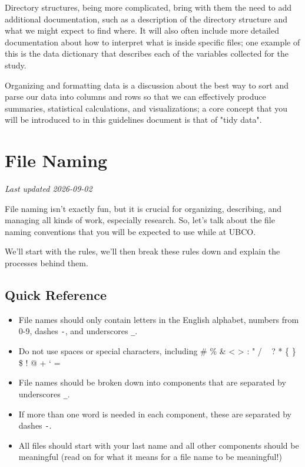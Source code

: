 \documentclass[
]{book}
\providecommand{\tightlist}{%
  \setlength{\itemsep}{0pt}\setlength{\parskip}{0pt}}
\begin{document}
Directory structures, being more complicated, bring with them the need to add additional documentation, such as a description of the directory structure and what we might expect to find where. It will also often include more detailed documentation about how to interpret what is inside specific files; one example of this is the data dictionary that describes each of the variables collected for the study.

Organizing and formatting data is a discussion about the best way to sort and parse our data into columns and rows so that we can effectively produce summaries, statistical calculations, and visualizations; a core concept that you will be introduced to in this guidelines document is that of "tidy data".

\chapter{File Naming}\label{file-naming}

\emph{Last updated 2026-09-02}

File naming isn't exactly fun, but it is crucial for organizing, describing, and managing all kinds of work, especially research. So, let's talk about the file naming conventions that you will be expected to use while at UBCO.

We'll start with the rules, we'll then break these rules down and explain the processes behind them.

\section{Quick Reference}\label{quick-reference}

\begin{itemize}
\tightlist
\item
  File names should only contain letters in the English alphabet, numbers from 0-9, dashes \texttt{-}, and underscores \texttt{\_}.
\item
  Do not use spaces or special characters, including \# \% \& \textless{} \textgreater{} : " / ~\textbar{} ? * \{ \} \$ ! \textquotesingle{} @ + ` =
\item
  File names should be broken down into components that are separated by underscores \texttt{\_}.
\item
  If more than one word is needed in each component, these are separated by dashes \texttt{-}.
\item
  All files should start with your last name and all other components should be meaningful (read on for what it means for a file name to be meaningful!)
\end{itemize}
\end{document}
